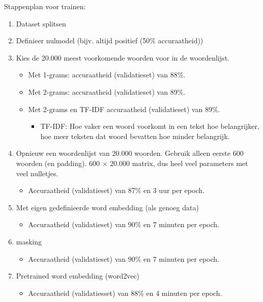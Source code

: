 {Stappenplan voor trainen:
\begin{enumerate}
    \item Dataset splitsen
    \item Definieer nulmodel (bijv. altijd positief (50\% accuraatheid))
    \item Kies de 20.000 meest voorkomende woorden voor in de woordenlijst.
    \begin{itemize}
        \item Met 1-grams: accuraatheid (validatieset) van 88\%.
        \item Met 2-grams: accuraatheid (validatieset) van 89\%.
        \item Met 2-grams en TF-IDF accuraatheid (validatieset) van 89\%.
        \begin{itemize}
            \item TF-IDF: Hoe vaker een woord voorkomt in een tekst hoe belangrijker, hoe meer teksten dat woord bevatten hoe minder belangrijk.
        \end{itemize}
    \end{itemize}
    \item Opnieuw een woordenlijst van 20.000 woorden. Gebruik alleen eerste 600 woorden (en padding). 600 $\times$ 20.000 matrix, dus heel veel parameters met veel nulletjes.
    \begin{itemize}
        \item Accuraatheid (validatieset) van 87\% en 3 uur per epoch. 
    \end{itemize}
    \item Met eigen gedefinieerde word embedding (als genoeg data)
    \begin{itemize}
        \item Accuraatheid (validatieset) van 90\% en 7 minuten per epoch.
    \end{itemize}
    \item masking
    \begin{itemize}
        \item Accuraatheid (validatieset) van 90\% en 7 minuten per epoch.
    \end{itemize}
    \item Pretrained word embedding ({\selectfont word2vec}) 
    \begin{itemize}
        \item Accuraatheid (validatiesset) van 88\% en 4 minuten per epoch.
    \end{itemize}
\end{enumerate}

}
